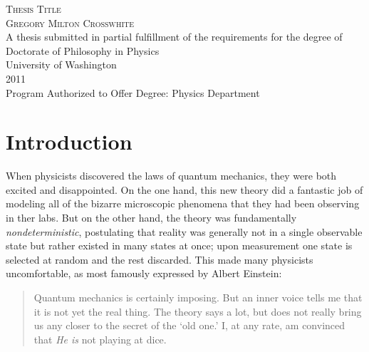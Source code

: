 \documentclass[12pt]{amsbook}
\theoremstyle{plain}
\theoremstyle{definition}
\theoremstyle{remark}
\begin{document}
\begin{center}

\textsc{\LARGE Thesis Title}\\[1.5cm]

\textsc{\Large Gregory Milton Crosswhite}\\[1.5cm]

A thesis submitted in partial fulfillment of the requirements for the degree of\\[1.5cm]

Doctorate of Philosophy in Physics\\[1.5cm]

University of Washington\\[1.5cm]

2011\\[1.5cm]

Program Authorized to Offer Degree:
Physics Department

\end{center}

\newpage
\tableofcontents
\listoftables
\part{Introduction}

When physicists discovered the laws of quantum mechanics, they were both excited and disappointed.  On the one hand, this new theory did a fantastic job of modeling all of the bizarre microscopic phenomena that they had been observing in ther labs.  But on the other hand, the theory was fundamentally \emph{nondeterministic}, postulating that reality was generally not in a single observable state but rather existed in many states at once; upon measurement one state is selected at random and the rest discarded.  This made many physicists uncomfortable, as most famously expressed by Albert Einstein:

\begin{quote}
Quantum mechanics is certainly imposing. But an inner voice tells me that it is not yet the real thing. The theory says a lot, but does not really bring us any closer to the secret of the `old one.' I, at any rate, am convinced that \emph{He is} not playing at dice{\cite{Born2004}}.
\end{quote}
\end{document}
